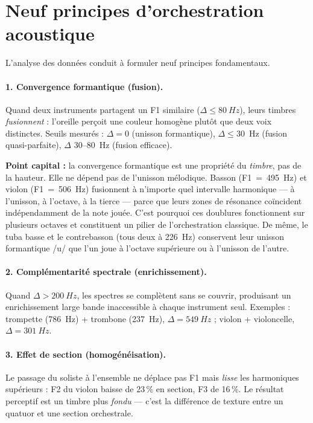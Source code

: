\documentclass[11pt,a4paper]{article}
\begin{document}
\section{Neuf principes d'orchestration acoustique}
\label{sec:principes}

L'analyse des données conduit à formuler neuf principes
fondamentaux.

\paragraph{1. Convergence formantique (fusion).}
Quand deux instruments partagent un F1 similaire ($\Delta \leq
\SI{80}{Hz}$), leurs timbres \emph{fusionnent} : l'oreille perçoit une
couleur homogène plutôt que deux voix distinctes. Seuils mesurés :
$\Delta = 0$ (unisson formantique), $\Delta \leq 30$~Hz (fusion
quasi-parfaite), $\Delta$ 30--80~Hz (fusion efficace).

\textbf{Point capital :} la convergence formantique est une propriété du
\emph{timbre}, pas de la hauteur. Elle ne dépend pas de l'unisson
mélodique. Basson (F1~=~\SI{495}{Hz}) et violon (F1~=~\SI{506}{Hz})
fusionnent à n'importe quel intervalle harmonique --- à l'unisson, à
l'octave, à la tierce --- parce que leurs zones de résonance coïncident
indépendamment de la note jouée. C'est pourquoi ces doublures
fonctionnent sur plusieurs octaves et constituent un pilier de
l'orchestration classique. De même, le tuba basse et le contrebasson
(tous deux à \SI{226}{Hz}) conservent leur unisson formantique /u/ que
l'un joue à l'octave supérieure ou à l'unisson de l'autre.

\paragraph{2. Complémentarité spectrale (enrichissement).}
Quand $\Delta > \SI{200}{Hz}$, les spectres se complètent sans se
couvrir, produisant un enrichissement large bande inaccessible à chaque
instrument seul. Exemples : trompette (\SI{786}{Hz}) + trombone
(\SI{237}{Hz}), $\Delta = \SI{549}{Hz}$ ; violon + violoncelle, $\Delta
= \SI{301}{Hz}$.

\paragraph{3. Effet de section (homogénéisation).}
Le passage du soliste à l'ensemble ne déplace pas F1 mais \emph{lisse}
les harmoniques supérieurs : F2 du violon baisse de 23\,\% en section, F3
de 16\,\%. Le résultat perceptif est un timbre plus \emph{fondu} ---
c'est la différence de texture entre un quatuor et une section
orchestrale.
\end{document}
